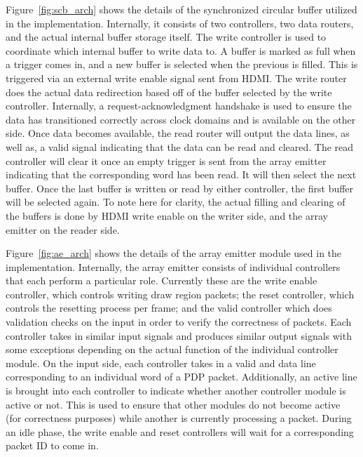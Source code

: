 Figure~\ref{fig:scb_arch} shows the details of the synchronized circular buffer utilized in the implementation. Internally, it consists of two controllers, two data routers, and the actual internal buffer storage itself. The write controller is used to coordinate which internal buffer to write data to. A buffer is marked as full when a trigger comes in, and a new buffer is selected when the previous is filled. This is triggered via an external write enable signal sent from HDMI. The write router does the actual data redirection based off of the buffer selected by the write controller. Internally, a request-acknowledgment handshake is used to ensure the data has transitioned correctly across clock domains and is available on the other side. Once data becomes available, the read router will output the data lines, as well as, a valid signal indicating that the data can be read and cleared. The read controller will clear it once an empty trigger is sent from the array emitter indicating that the corresponding word has been read. It will then select the next buffer. Once the last buffer is written or read by either controller, the first buffer will be selected again. To note here for clarity, the actual filling and clearing of the buffers is done by HDMI write enable on the writer side, and the array emitter on the reader side.

Figure~\ref{fig:ae_arch} shows the details of the array emitter module used in the implementation. Internally, the array emitter consists of individual controllers that each perform a particular role. Currently these are the write enable controller, which controls writing draw region packets; the reset controller, which controls the resetting process per frame; and the valid controller which does validation checks on the input in order to verify the correctness of packets. Each controller takes in similar input signals and produces similar output signals with some exceptions depending on the actual function of the individual controller module. On the input side, each controller takes in a valid and data line corresponding to an individual word of a PDP packet. Additionally, an active line is brought into each controller to indicate whether another controller module is active or not. This is used to ensure that other modules do not become active (for correctness purposes) while another is currently processing a packet. During an idle phase, the write enable and reset controllers will wait for a corresponding packet ID to come in.

